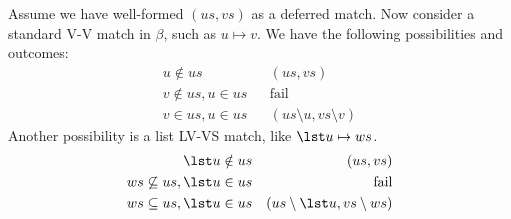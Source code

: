 Assume we have well-formed $(us,vs)$ as a deferred match.
Now consider a standard V-V match in $\beta$, such as $u \mapsto v$.
We have the following possibilities and outcomes:
\begin{eqnarray*}
   u \notin us  && (us,vs)
\\ v \notin us, u \in us && \mbox{fail}
\\ v \in us, u \in us && (us \setminus u, vs \setminus v)
\end{eqnarray*}
Another possibility is a list LV-VS match, like $\lst u \mapsto ws$.
\begin{eqnarray*}
   \lst u \notin us  && (us,vs)
\\ ws \not\subseteq us, \lst u \in us && \mbox{fail}
\\ ws \subseteq us, \lst u \in us && (us \setminus \lst u, vs \setminus ws)
\end{eqnarray*}
